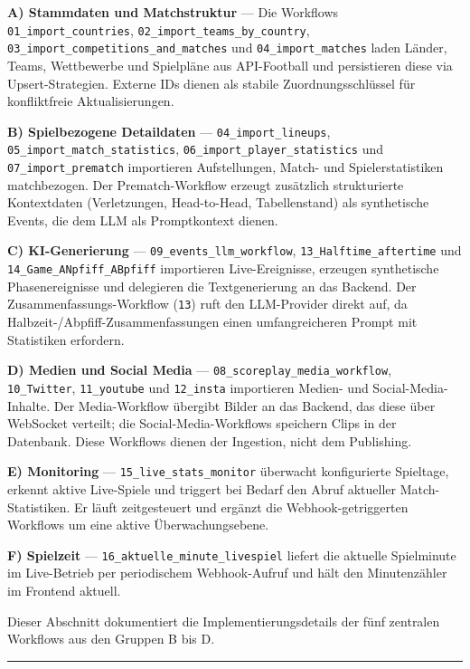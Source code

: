 \textbf{A) Stammdaten und Matchstruktur} --- Die Workflows
\texttt{01\_import\_countries}, \texttt{02\_import\_teams\_by\_country},
\texttt{03\_import\_competitions\_and\_matches} und
\texttt{04\_import\_matches} laden Länder, Teams, Wettbewerbe und
Spielpläne aus API-Football und persistieren diese via
Upsert-Strategien. Externe IDs dienen als stabile Zuordnungsschlüssel
für konfliktfreie Aktualisierungen.

\textbf{B) Spielbezogene Detaildaten} --- \texttt{04\_import\_lineups},
\texttt{05\_import\_match\_statistics},
\texttt{06\_import\_player\_statistics} und
\texttt{07\_import\_prematch} importieren Aufstellungen, Match- und
Spielerstatistiken matchbezogen. Der Prematch-Workflow erzeugt
zusätzlich strukturierte Kontextdaten (Verletzungen, Head-to-Head,
Tabellenstand) als synthetische Events, die dem LLM als Promptkontext
dienen.

\textbf{C) KI-Generierung} --- \texttt{09\_events\_llm\_workflow},
\texttt{13\_Halftime\_aftertime} und \texttt{14\_Game\_ANpfiff\_ABpfiff}
importieren Live-Ereignisse, erzeugen synthetische Phasenereignisse und
delegieren die Textgenerierung an das Backend. Der
Zusammenfassungs-Workflow (\texttt{13}) ruft den LLM-Provider direkt
auf, da Halbzeit-/Abpfiff-Zusammenfassungen einen umfangreicheren Prompt
mit Statistiken erfordern.

\textbf{D) Medien und Social Media} ---
\texttt{08\_scoreplay\_media\_workflow}, \texttt{10\_Twitter},
\texttt{11\_youtube} und \texttt{12\_insta} importieren Medien- und
Social-Media-Inhalte. Der Media-Workflow übergibt Bilder an das Backend,
das diese über WebSocket verteilt; die Social-Media-Workflows speichern
Clips in der Datenbank. Diese Workflows dienen der Ingestion, nicht dem
Publishing.

\textbf{E) Monitoring} --- \texttt{15\_live\_stats\_monitor} überwacht
konfigurierte Spieltage, erkennt aktive Live-Spiele und triggert bei
Bedarf den Abruf aktueller Match-Statistiken. Er läuft zeitgesteuert und
ergänzt die Webhook-getriggerten Workflows um eine aktive Überwachungsebene.

\textbf{F) Spielzeit} --- \texttt{16\_aktuelle\_minute\_livespiel} liefert
die aktuelle Spielminute im Live-Betrieb per periodischem Webhook-Aufruf
und hält den Minutenzähler im Frontend aktuell.

Dieser Abschnitt dokumentiert die Implementierungsdetails der fünf
zentralen Workflows aus den Gruppen B bis D.

\begin{center}\rule{0.5\linewidth}{0.5pt}\end{center}


